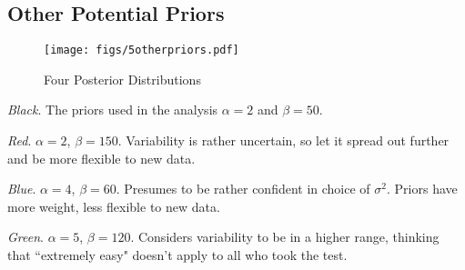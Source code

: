 \documentclass[12pt]{article}
\begin{document}
\subsection{Other Potential Priors}

\begin{figure}[H]
\begin{center}
\texttt{[image: figs/5otherpriors.pdf]}
\caption{Four Posterior Distributions}
\end{center}
\end{figure}

\noindent \textit{Black}.  The priors used in the analysis $\alpha=2$ and $\beta=50$.

\noindent \textit{Red}. $\alpha=2$, $\beta=150$.  Variability is rather uncertain, so let it spread out further and be more flexible to new data.

\noindent \textit{Blue}. $\alpha=4$, $\beta=60$.  Presumes to be rather confident in choice of $\sigma^2$.  Priors have more weight, less flexible to new data.

\noindent \textit{Green}. $\alpha=5$, $\beta=120$.  Considers variability to be in a higher range, thinking that ``extremely easy" doesn't apply to all who took the test.

%
\end{document}
